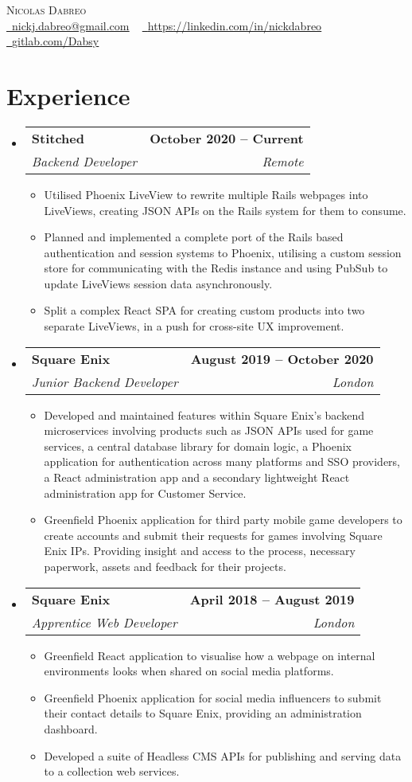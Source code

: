 \documentclass[a4paper,10pt]{article}
\makeatletter
\newcommand{\resumeItem}[1]{
  \item\small{
    {#1 \vspace{2pt}}
  }
}
\newcommand{\resumeSubheading}[4]{
  \vspace{2pt}\item
    \begin{tabular*}{1.0\textwidth}[t]{l@{\extracolsep{\fill}}r}
      \textbf{#1} & \textbf{\small #2} \\
      \textit{\small#3} & \textit{\small #4} \\
    \end{tabular*}\vspace{-7pt}
}
\newcommand{\resumeSubHeadingListStart}{\begin{itemize}[leftmargin=0.0in, label={}]}
\newcommand{\resumeSubHeadingListEnd}{\end{itemize}}
\newcommand{\resumeItemListStart}{\begin{itemize}}
\newcommand{\resumeItemListEnd}{\end{itemize}\vspace{-5pt}}
\makeatother
\begin{document}
\begin{center}
    {\Huge \scshape Nicolas Dabreo} \\ \vspace{1pt}
    \small \href{mailto:nickj.dabreo@gmail.com}{\raisebox{-0.2\height}\faEnvelope\  \underline{nickj.dabreo@gmail.com}} ~ 
    \href{https://linkedin.com/in/nickdabreo}{\raisebox{-0.2\height}\faLinkedin\ \underline{https://linkedin.com/in/nickdabreo}}  ~
    \href{https://gitlab.com/Dabsy}{\raisebox{-0.2\height}\faGitlab\ \underline{gitlab.com/Dabsy}}
\end{center}
\vspace{8pt}

\section{Experience}
  \resumeSubHeadingListStart
    \resumeSubheading
      {Stitched}{October 2020 -- Current}
      {Backend Developer}{Remote}
      \resumeItemListStart
        \resumeItem{Utilised Phoenix LiveView to rewrite multiple Rails webpages into LiveViews, creating JSON APIs on the Rails system for them to consume.}
        \resumeItem{Planned and implemented a complete port of the Rails based authentication and session systems to Phoenix, utilising a custom session store for communicating with the Redis instance and using PubSub to update LiveViews session data asynchronously.}
        \resumeItem{Split a complex React SPA for creating custom products into two separate LiveViews, in a push for cross-site UX improvement.}
      \resumeItemListEnd

    \resumeSubheading
      {Square Enix}{August 2019 -- October 2020}
      {Junior Backend Developer}{London}
      \resumeItemListStart
        \resumeItem{Developed and maintained features within Square Enix's backend microservices involving products such as JSON APIs used for game services, a central database library for domain logic, a Phoenix application for authentication across many platforms and SSO providers, a React administration app and a secondary lightweight React administration app for Customer Service.}
        \resumeItem{Greenfield Phoenix application for third party mobile game developers to create accounts and submit their requests for games involving Square Enix IPs. Providing insight and access to the process, necessary paperwork, assets and feedback for their projects.}
    \resumeItemListEnd

    \resumeSubheading
      {Square Enix}{April 2018 -- August 2019}
      {Apprentice Web Developer}{London}
      \resumeItemListStart
        \resumeItem{Greenfield React application to visualise how a webpage on internal environments looks when shared on social media platforms.}
        \resumeItem{Greenfield Phoenix application for social media influencers to submit their contact details to Square Enix, providing an administration dashboard.}
        \resumeItem{Developed a suite of Headless CMS APIs for publishing and serving data to a collection web services.}
    \resumeItemListEnd
  \resumeSubHeadingListEnd
\vspace{5pt}
\end{document}
